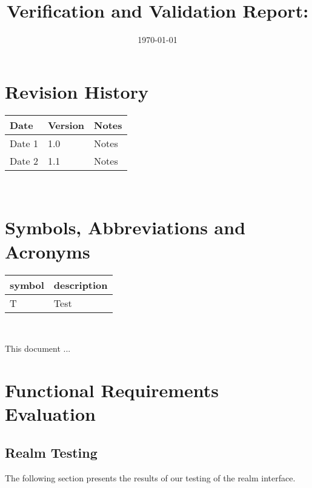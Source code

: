\documentclass[12pt, titlepage]{article}
\begin{document}
\title{Verification and Validation Report: \progname} 
\author{\authname}
\date{\today}
	
\maketitle


\section{Revision History}

\begin{tabularx}{\textwidth}{p{3cm}p{2cm}X}
\toprule {\bf Date} & {\bf Version} & {\bf Notes}\\
\midrule
Date 1 & 1.0 & Notes\\
Date 2 & 1.1 & Notes\\
\bottomrule
\end{tabularx}

~\newpage

\section{Symbols, Abbreviations and Acronyms}

\renewcommand{\arraystretch}{1.2}
\begin{tabular}{l l} 
  \toprule		
  \textbf{symbol} & \textbf{description}\\
  \midrule 
  T & Test\\
  \bottomrule
\end{tabular}\\


\newpage

\tableofcontents

\listoftables %

\listoffigures %

\newpage


This document ...

\section{Functional Requirements Evaluation}

\subsection{Realm Testing}
The following section presents the results of our testing of the realm interface.
\end{document}
